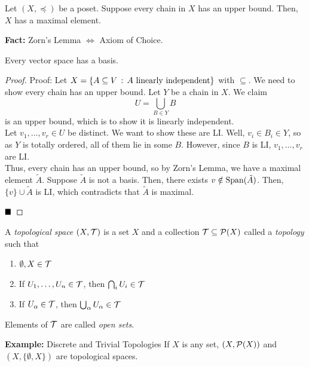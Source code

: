 \begin{lemma}
    Let $(X, \preceq)$ be a poset. Suppose every chain in $X$ has an upper bound. Then, $X$ has a maximal element.
\end{lemma}

\textbf{Fact:} Zorn's Lemma $\iff$ Axiom of Choice.

\begin{theorem}
    Every vector space has a basis.
\end{theorem}
\begin{proof}{Proof:}
    Let $X = \{A \subseteq V \col A \tt{ linearly independent}\}$ with $\subseteq$. We need to show every chain has an upper bound. Let $Y$ be a chain in $X$. We claim
    \[ U = \bigcup_{B \in Y} B \]
    is an upper bound, which is to show it is linearly independent.\\


    Let $v_1, \ldots, v_r \in U$ be distinct. We want to show these are LI. Well, $v_i \in B_i \in Y$, so as $Y$ is totally ordered, all of them lie in some $B$. However, since $B$ is LI, $v_1, \ldots, v_r$ are LI.\\

    Thus, every chain has an upper bound, so by Zorn's Lemma, we have a maximal element $\tilde{A}$. Suppose $\tilde{A}$ is not a basis. Then, there exists $v \notin \Span(\tilde{A})$. Then, $\{v\} \cup \tilde{A}$ is LI, which contradicts that $\tilde{A}$ is maximal.

    $\qed$
\end{proof}

\begin{definition}
    A \emph{topological space} $(X, \cal{T})$ is a set $X$ and a collection $\cal{T} \subseteq \P(X)$ called a \emph{topology} such that
    \begin{enumerate}[label = (\roman*)]
        \item $\emptyset, X \in \cal{T}$
        \item If $U_1, \ldots, U_n \in \cal{T}$, then $\bigcap_{i} U_i \in \cal{T}$
        \item If $U_{\alpha} \in \cal{T}$, then $\bigcup_{\alpha} U_{\alpha} \in \cal{T}$
    \end{enumerate}
    Elements of $\cal{T}$ are called \emph{open sets}.
\end{definition}

\begin{example}{\textbf{Example:} Discrete and Trivial Topologies}
    If $X$ is any set, $(X, \P(X))$ and $(X, \{\emptyset, X\})$ are topological spaces.
\end{example}


